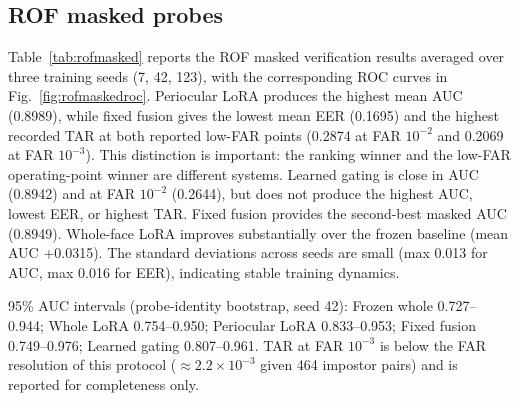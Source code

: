 ﻿\documentclass[10pt,journal,compsoc]{IEEEtran}
\begin{document}
\subsection{ROF masked probes}
Table~\ref{tab:rofmasked} reports the ROF masked verification results averaged over three training seeds (7, 42, 123), with the corresponding ROC curves in Fig.~\ref{fig:rofmaskedroc}. Periocular LoRA produces the highest mean AUC (0.8989), while fixed fusion gives the lowest mean EER (0.1695) and the highest recorded TAR at both reported low-FAR points (0.2874 at FAR $10^{-2}$ and 0.2069 at FAR $10^{-3}$). This distinction is important: the ranking winner and the low-FAR operating-point winner are different systems. Learned gating is close in AUC (0.8942) and at FAR $10^{-2}$ (0.2644), but does not produce the highest AUC, lowest EER, or highest TAR. Fixed fusion provides the second-best masked AUC (0.8949). Whole-face LoRA improves substantially over the frozen baseline (mean AUC +0.0315). The standard deviations across seeds are small (max 0.013 for AUC, max 0.016 for EER), indicating stable training dynamics.

\begin{table}[t]
\centering
\caption{ROF masked probes, neutral enrollment. Values are mean AUC, mean EER, mean TAR at FAR $10^{-2}$, and mean TAR at FAR $10^{-3}$ over three seeds (7, 42, 123); subscripts show standard deviation across seeds.}
\label{tab:rofmasked}

{\footnotesize 95\% AUC intervals (probe-identity bootstrap, seed 42): Frozen whole 0.727--0.944; Whole LoRA 0.754--0.950; Periocular LoRA 0.833--0.953; Fixed fusion 0.749--0.976; Learned gating 0.807--0.961. TAR at FAR $10^{-3}$ is below the FAR resolution of this protocol (${\approx}2.2\times10^{-3}$ given 464 impostor pairs) and is reported for completeness only.}
\end{table}
\end{document}
